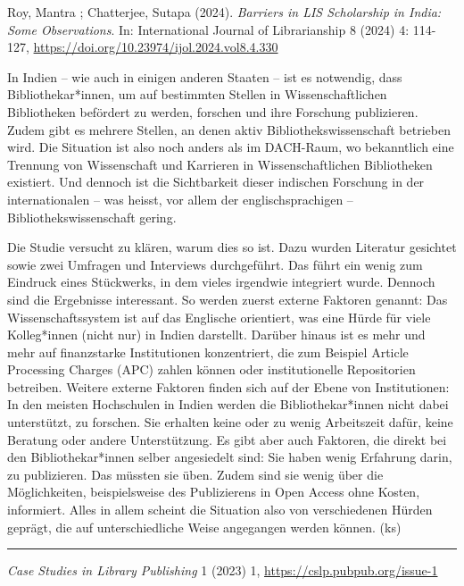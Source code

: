 \documentclass[a4paper,
fontsize=11pt,
oneside,
numbers=noperiodatend,
parskip=half-,
bibliography=totoc,
final
]{scrartcl}
\begin{document}
Roy, Mantra ; Chatterjee, Sutapa (2024). \emph{Barriers in LIS
Scholarship in India: Some Observations}. In: International Journal of
Librarianship 8 (2024) 4: 114-127,
\url{https://doi.org/10.23974/ijol.2024.vol8.4.330}

In Indien -- wie auch in einigen anderen Staaten -- ist es notwendig,
dass Bibliothekar*innen, um auf bestimmten Stellen in Wissenschaftlichen
Bibliotheken befördert zu werden, forschen und ihre Forschung
publizieren. Zudem gibt es mehrere Stellen, an denen aktiv
Bibliothekswissenschaft betrieben wird. Die Situation ist also noch
anders als im DACH-Raum, wo bekanntlich eine Trennung von Wissenschaft
und Karrieren in Wissenschaftlichen Bibliotheken existiert. Und dennoch
ist die Sichtbarkeit dieser indischen Forschung in der internationalen
-- was heisst, vor allem der englischsprachigen --
Bibliothekswissenschaft gering.

Die Studie versucht zu klären, warum dies so ist. Dazu wurden Literatur
gesichtet sowie zwei Umfragen und Interviews durchgeführt. Das führt ein
wenig zum Eindruck eines Stückwerks, in dem vieles irgendwie integriert
wurde. Dennoch sind die Ergebnisse interessant. So werden zuerst externe
Faktoren genannt: Das Wissenschaftssystem ist auf das Englische
orientiert, was eine Hürde für viele Kolleg*innen (nicht nur) in Indien
darstellt. Darüber hinaus ist es mehr und mehr auf finanzstarke
Institutionen konzentriert, die zum Beispiel Article Processing Charges
(APC) zahlen können oder institutionelle Repositorien betreiben. Weitere
externe Faktoren finden sich auf der Ebene von Institutionen: In den
meisten Hochschulen in Indien werden die Bibliothekar*innen nicht dabei
unterstützt, zu forschen. Sie erhalten keine oder zu wenig Arbeitszeit
dafür, keine Beratung oder andere Unterstützung. Es gibt aber auch
Faktoren, die direkt bei den Bibliothekar*innen selber angesiedelt sind:
Sie haben wenig Erfahrung darin, zu publizieren. Das müssten sie üben.
Zudem sind sie wenig über die Möglichkeiten, beispielsweise des
Publizierens in Open Access ohne Kosten, informiert. Alles in allem
scheint die Situation also von verschiedenen Hürden geprägt, die auf
unterschiedliche Weise angegangen werden können. (ks)

\begin{center}\rule{0.5\linewidth}{0.5pt}\end{center}

\emph{Case Studies in Library Publishing} 1 (2023) 1,
\url{https://cslp.pubpub.org/issue-1}
\end{document}
